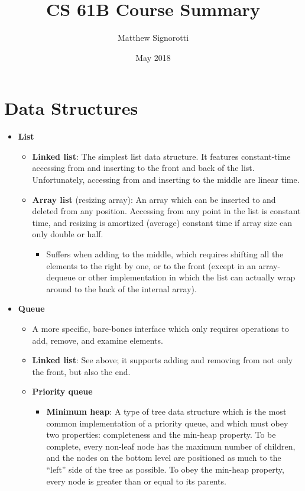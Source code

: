 \documentclass{article}
\title{CS 61B Course Summary}
\author{Matthew Signorotti}
\date{May 2018}
\begin{document}
\maketitle

\section{Data Structures}

\begin{itemize}
    \item \textbf{List}
    \begin{itemize}
        \item \textbf{Linked list}: The simplest list data structure. It features constant-time accessing from and inserting to the front and back of the list. Unfortunately, accessing from and inserting to the middle are linear time.
        \item \textbf{Array list} (resizing array): An array which can be inserted to and deleted from any position. Accessing from any point in the list is constant time, and resizing is amortized (average) constant time if array size can only double or half.
        \begin{itemize}
            \item Suffers when adding to the middle, which requires shifting all the elements to the right by one, or to the front (except in an array-dequeue or other implementation in which the list can actually wrap around to the back of the internal array).
        \end{itemize}
    \end{itemize}
    \item \textbf{Queue}
    \begin{itemize}
        \item A more specific, bare-bones interface which only requires operations to add, remove, and examine elements.
        \item \textbf{Linked list}: See above; it supports adding and removing from not only the front, but also the end.
        \item \textbf{Priority queue}
        \begin{itemize}
            \item \textbf{Minimum heap}: A type of tree data structure which is the most common implementation of a priority queue, and which must obey two properties: completeness and the min-heap property. To be complete, every non-leaf node has the maximum number of children, and the nodes on the bottom level are positioned as much to the ``left'' side of the tree as possible. To obey the min-heap property, every node is greater than or equal to its parents.

\end{itemize}
\end{itemize}
\end{itemize}
\end{document}
